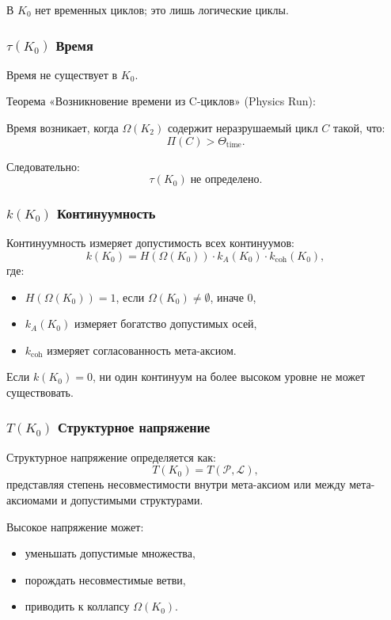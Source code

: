 В $K_0$ нет временных циклов; это лишь логические циклы.

\subsubsection{\texorpdfstring{$\tau(K_0)$}{\tau(K_0)} Время}

Время не существует в $K_0$.

Теорема «Возникновение времени из C-циклов» (Physics Run):

Время возникает, когда $\Omega(K_2)$ содержит неразрушаемый цикл
$C$ такой, что:
\[
\Pi(C) > \Theta_{\mathrm{time}}.
\]

Следовательно:
\[
\tau(K_0) \;\text{не определено}.
\]

\subsubsection{\texorpdfstring{$k(K_0)$}{k(K_0)} Континуумность}

Континуумность измеряет допустимость всех континуумов:
\[
k(K_0) =
H(\Omega(K_0)) \cdot
k_A(K_0) \cdot
k_{\mathrm{coh}}(K_0),
\]
где:
\begin{itemize}
    \item $H(\Omega(K_0)) = 1$, если $\Omega(K_0)\neq\emptyset$, иначе $0$,
    \item $k_A(K_0)$ измеряет богатство допустимых осей,
    \item $k_{\mathrm{coh}}$ измеряет согласованность мета-аксиом.
\end{itemize}

Если $k(K_0)=0$, ни один континуум на более высоком уровне не может
существовать.

\subsubsection{\texorpdfstring{$T(K_0)$}{T(K_0)} Структурное напряжение}

Структурное напряжение определяется как:
\[
T(K_0) = T(\mathcal{P}, \mathcal{L}),
\]
представляя степень несовместимости внутри мета-аксиом или между
мета-аксиомами и допустимыми структурами.

Высокое напряжение может:
\begin{itemize}
    \item уменьшать допустимые множества,
    \item порождать несовместимые ветви,
    \item приводить к коллапсу $\Omega(K_0)$.
\end{itemize}

